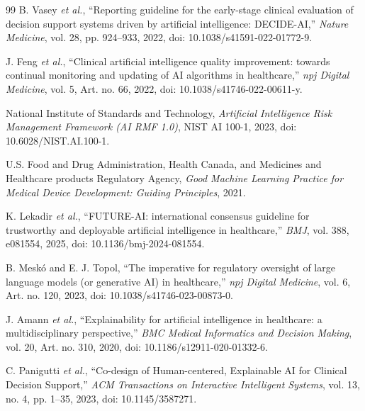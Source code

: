 \documentclass[conference]{IEEEtran}
\begin{document}
\begin{thebibliography}{99}
B. Vasey \textit{et al.}, ``Reporting guideline for the early-stage clinical evaluation of decision support systems driven by artificial intelligence: DECIDE-AI,'' \emph{Nature Medicine}, vol. 28, pp. 924--933, 2022, doi: 10.1038/s41591-022-01772-9.

J. Feng \textit{et al.}, ``Clinical artificial intelligence quality improvement: towards continual monitoring and updating of AI algorithms in healthcare,'' \emph{npj Digital Medicine}, vol. 5, Art. no. 66, 2022, doi: 10.1038/s41746-022-00611-y.

National Institute of Standards and Technology, \emph{Artificial Intelligence Risk Management Framework (AI RMF 1.0)}, NIST AI 100-1, 2023, doi: 10.6028/NIST.AI.100-1.

U.S. Food and Drug Administration, Health Canada, and Medicines and Healthcare products Regulatory Agency, \emph{Good Machine Learning Practice for Medical Device Development: Guiding Principles}, 2021.

K. Lekadir \textit{et al.}, ``FUTURE-AI: international consensus guideline for trustworthy and deployable artificial intelligence in healthcare,'' \emph{BMJ}, vol. 388, e081554, 2025, doi: 10.1136/bmj-2024-081554.

B. Mesk\'o and E. J. Topol, ``The imperative for regulatory oversight of large language models (or generative AI) in healthcare,'' \emph{npj Digital Medicine}, vol. 6, Art. no. 120, 2023, doi: 10.1038/s41746-023-00873-0.

J. Amann \textit{et al.}, ``Explainability for artificial intelligence in healthcare: a multidisciplinary perspective,'' \emph{BMC Medical Informatics and Decision Making}, vol. 20, Art. no. 310, 2020, doi: 10.1186/s12911-020-01332-6.

C. Panigutti \textit{et al.}, ``Co-design of Human-centered, Explainable AI for Clinical Decision Support,'' \emph{ACM Transactions on Interactive Intelligent Systems}, vol. 13, no. 4, pp. 1--35, 2023, doi: 10.1145/3587271.

\end{thebibliography}
\end{document}
